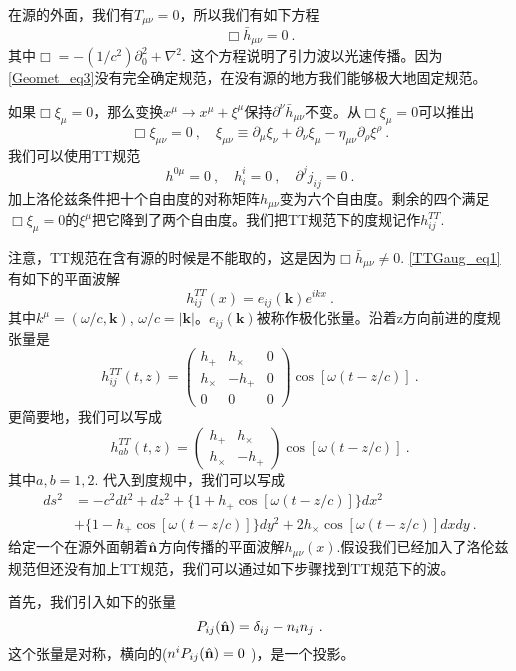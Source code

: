 在源的外面，我们有$T_{\mu\nu} = 0$，所以我们有如下方程
\begin{equation}\label{TTGaug_eq1}
\Box \bar h_{\mu\nu} = 0 ~.
\end{equation}
其中$\Box = - (1/c^2) \partial_0^2 +\nabla^2$. 这个方程说明了引力波以光速传播。因为\autoref{Geomet_eq3}没有完全确定规范，在没有源的地方我们能够极大地固定规范。

如果$\Box \xi_\mu = 0$，那么变换$x^\mu \rightarrow x^\mu+\xi^\mu$保持$\partial^\nu \bar h_{\mu\nu}$不变。从$\Box \xi_\mu = 0$可以推出
\begin{equation}
\Box \xi_{\mu\nu} = 0~, \quad \xi_{\mu\nu} \equiv \partial_{\mu} \xi_\nu +\partial_\nu \xi_\mu - \eta_{\mu\nu} \partial_\rho\xi^\rho~. 
\end{equation}
我们可以使用TT规范
\begin{equation}
h^{0\mu} = 0~, \quad h^i_i = 0~, \quad \partial^j j_{ij} = 0~.
\end{equation}
加上洛伦兹条件把十个自由度的对称矩阵$h_{\mu\nu}$变为六个自由度。剩余的四个满足$\Box \xi_\mu = 0$的$\xi^\mu$把它降到了两个自由度。我们把TT规范下的度规记作$h_{ij}^{TT}$. 

注意，TT规范在含有源的时候是不能取的，这是因为$\Box \bar h_{\mu\nu} \neq 0$. \autoref{TTGaug_eq1}有如下的平面波解
\begin{equation}
h_{ij}^{TT} (x) = e_{ij} (\mathbf k) e^{ikx} ~.  
\end{equation}
其中$k^\mu = (\omega/c,\mathbf k)$, $\omega/c = |\mathbf k|$。$e_{ij}(\mathbf k)$被称作极化张量。沿着z方向前进的度规张量是
\begin{equation}
h_{ij}^{TT} (t,z) = 
\begin{pmatrix}
h_+ & h_\times & 0 \\
h_\times & - h_+ & 0 \\
0 & 0 & 0
\end{pmatrix} \cos [\omega (t - z/c)]~. 
\end{equation}
更简要地，我们可以写成
\begin{equation}
h_{ab}^{TT} (t,z) = 
\begin{pmatrix}
h_+ & h_\times   \\
h_\times & - h_+   
\end{pmatrix} \cos [\omega (t - z/c)]~. 
\end{equation}
其中$a,b = 1,2$. 代入到度规中，我们可以写成
\begin{equation}
\begin{aligned}
ds^2 & = - c^2 dt^2 + dz^2 + \{ 1+ h_+ \cos [\omega(t-z/c)] \} dx^2 \\
& + \{ 1-h_+ \cos [\omega(t-z/c)] \} dy^2 + 2 h_\times \cos[\omega(t-z/c)] dx dy~.
\end{aligned}
\end{equation}
给定一个在源外面朝着$\hat{\bf{n}}$方向传播的平面波解$h_{\mu\nu}(x)$.假设我们已经加入了洛伦兹规范但还没有加上TT规范，我们可以通过如下步骤找到TT规范下的波。

首先，我们引入如下的张量
\begin{equation}
P_{ij} (\hat{\bf{n}} ) = \delta_{ij} - n_in_j~.
\end{equation}
这个张量是对称，横向的($ n^iP_{ij}(\hat{\bf{n}}) = 0 $ )，是一个投影。















